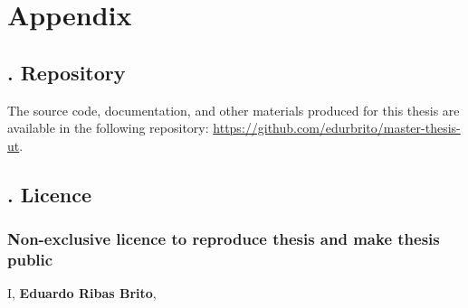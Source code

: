 \appendix

\section*{Appendix}

\renewcommand{\theappendixcounter}{\Roman{appendixcounter}}



\subsection*{. Repository} \label{appendix:repository}


The source code, documentation, and other materials produced for this thesis are available in the following repository: \url{https://github.com/edurbrito/master-thesis-ut}.


\newcommand{\licencehint}[2]{\\\hspace*{#1}\textsl(#2)\par}


\subsection*{. Licence}


\subsubsection*{Non-exclusive licence to reproduce thesis and make thesis public}

I, \textbf{Eduardo Ribas Brito}, %

